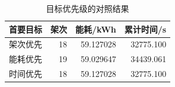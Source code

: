 \begin{table}[htbp]
\centering
\caption{目标优先级的对照结果}
\label{tab:q1:priorities}
\begin{tabular}{lrrr}
\toprule
首要目标 & 架次 & 能耗/kWh & 累计时间/s \\
\midrule
架次优先 & 18 & 59.127028 & 32775.100 \\
能耗优先 & 19 & 59.029647 & 34439.061 \\
时间优先 & 18 & 59.127028 & 32775.100 \\
\bottomrule
\end{tabular}
\end{table}
